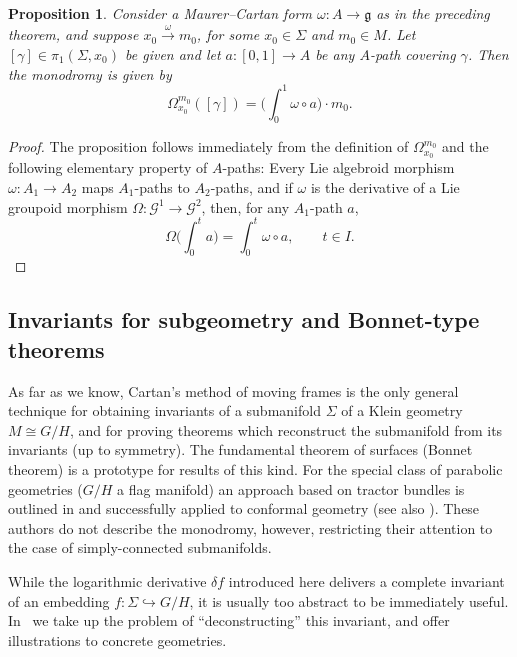 \documentclass[10pt,a4paper]{amsart}
\numberwithin{equation}{section}
\newtheorem{Proposition}[Theorem]{Proposition}
\newcommand\integral{\int}
\begin{document}
\begin{Proposition}%
Consider a Maurer--Cartan form $\omega \colon A
 \rightarrow {\mathfrak g} $ as in the preceding theorem, and suppose
 $x_0\xrightarrow{\omega}m_0$, for some $x_0 \in \Sigma $ and
 $m_0 \in M$. Let $[\gamma] \in \pi_1(\Sigma,x_0)$ be given and let
 $a \colon [0,1]\rightarrow A$ be {\em any} $A$-path covering
 $\gamma $. Then the monodromy is given by
 \[
 \Omega_{x_0}^{m_0}([\gamma])=\bigg(\integral_0^1 \omega \circ a\bigg)\cdot m_0.
\]
\end{Proposition}
%
\begin{proof} The proposition follows immediately from the definition
of $\Omega_{x_0}^{m_0}$ and the following ele\-mentary property of
$A$-paths: Every Lie algebroid morphism $\omega \colon A_1 \rightarrow
A_2$ maps $A_1$-paths to $A_2$-paths, and if $\omega $ is the
derivative of a Lie groupoid morphism $\Omega \colon {\mathcal G}^1
\rightarrow {\mathcal G}^2$, then, for any $A_1$-path $a$,
 \begin{equation*}
 \Omega \bigg(\integral_0^t a\bigg) =
\integral_0^t \omega \circ a, \qquad t \in I.\tag*{\qed}
 \end{equation*}\renewcommand{\qed}{}
\end{proof}

\subsection*{Invariants for subgeometry and Bonnet-type theorems} As
far as we know, Cartan's method of moving frames is the only general
technique for obtaining invariants of a submanifold $\Sigma $ of a
Klein geometry $M \cong G/H$, and for proving theorems which
reconstruct the submanifold from its invariants (up to symmetry). The
fundamental theorem of surfaces (Bonnet theorem) is a prototype for
results of this kind. For the special class of parabolic geometries
($G/H$ a flag manifold) an approach based on tractor bundles is
outlined in \cite{Burstall_Calderbank_04} and successfully applied to
conformal geometry (see also \cite{Burstall_Calderbank_10}). These
authors do not describe the monodromy, however, restricting their
attention to the case of simply-connected submanifolds.

While the logarithmic derivative $\delta f$ introduced here delivers a
complete invariant of an embedding $f \colon \Sigma \hookrightarrow
G/H$, it is usually too abstract to be immediately useful. In~\cite{Blaom_G} we take up the problem of ``deconstructing'' this
invariant, and offer illustrations to concrete geometries.
\end{document}
